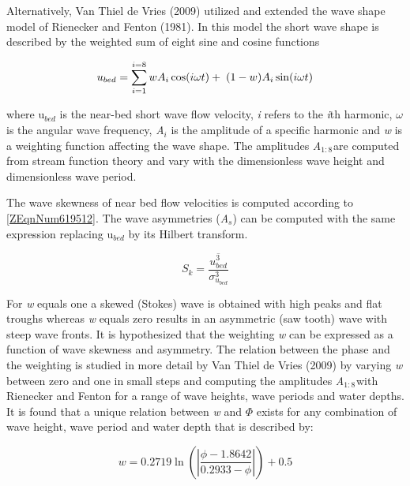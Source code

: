 \documentclass{article}
\begin{document}
\noindent Alternatively, Van Thiel de Vries (2009) utilized and extended the wave shape model of Rienecker and Fenton (1981). In this model the short wave shape is described by the weighted sum of eight sine and cosine functions

\noindent 
\begin{equation} \label{2.29)} 
u_{bed} =\sum _{i=1}^{i=8}wA_{i} \cos (i\omega t)+{\rm \; }(1-w) A_{i} \sin (i\omega t) 
\end{equation} 


\noindent where u${}_{bed}$ is the near-bed short wave flow velocity, \textit{i} refers to the \textit{i}th harmonic, \textit{$\omega $} is the angular wave frequency, \textit{A${}_{i}$} is the amplitude of a specific harmonic and \textit{w} is a weighting function affecting the wave shape. The amplitudes \textit{A${}_{1:8}$}${}_{ }$are computed from stream function theory and vary with the dimensionless wave height and dimensionless wave period.

\noindent 

\noindent The wave skewness of near bed flow velocities is computed according to \eqref{ZEqnNum619512}. The wave asymmetries (\textit{A${}_{s}$}) can be computed with the same expression replacing u${}_{bed}$ by its Hilbert transform.

\noindent 
\begin{equation} \label{ZEqnNum619512} 
S_{k} =\frac{\overline{u_{bed}^{3} }}{\sigma _{u_{bed} }^{3} }  
\end{equation} 


\noindent For \textit{w} equals one a skewed (Stokes) wave is obtained with high peaks and flat troughs whereas \textit{w} equals zero results in an asymmetric (saw tooth) wave with steep wave fronts. It is hypothesized that the weighting \textit{w} can be expressed as a function of wave skewness and asymmetry. The relation between the phase and the weighting is studied in more detail by Van Thiel de Vries (2009) by varying \textit{w} between zero and one in small steps and computing the amplitudes \textit{A${}_{1:8}$}${}_{ }$with Rienecker and Fenton for a range of wave heights, wave periods and water depths. It is found that a unique relation between \textit{w} and \textit{$\Phi $} exists for any combination of wave height, wave period and water depth that is described by:

\noindent 
\begin{equation} \label{2.31)} 
w=0.2719\ln \left(\left|\frac{\phi -1.8642}{0.2933-\phi } \right|\right)+0.5 
\end{equation} 
\end{document}
